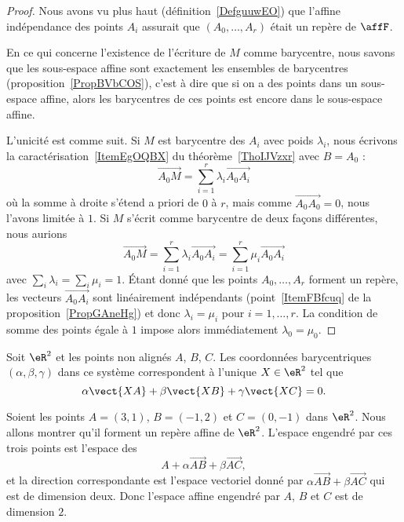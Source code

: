 \begin{proof}
    Nous avons vu plus haut (définition~\ref{DefguuwEO}) que l'affine indépendance des points \( A_i\) assurait que \( (A_0,\ldots, A_r)\) était un repère de \( \affF\).

    En ce qui concerne l'existence de l'écriture de \( M\) comme barycentre, nous savons que les sous-espace affine sont exactement les ensembles de barycentres (proposition~\ref{PropBVbCOS}), c'est à dire que si on a des points dans un sous-espace affine, alors les barycentres de ces points est encore dans le sous-espace affine.

    L'unicité est comme suit. Si \( M\) est barycentre des \( A_i\) avec poids \( \lambda_i\), nous écrivons la caractérisation~\ref{ItemEgOQBX} du théorème~\ref{ThoIJVzxr} avec \( B=A_0\) :
    \begin{equation}
        \overrightarrow{ A_0M }=\sum_{i=1}^r\lambda_i\overrightarrow{ A_0A_i }
    \end{equation}
    où la somme à droite s'étend a priori de \( 0\) à \( r\), mais comme \( \overrightarrow{ A_0A_0 }=0\), nous l'avons limitée à \( 1\). Si \( M\) s'écrit comme barycentre de deux façons différentes, nous aurions
    \begin{equation}
        \overrightarrow{ A_0M }=\sum_{i=1}^r\lambda_i\overrightarrow{ A_0A_i }=\sum_{i=1}^r\mu_i\overrightarrow{ A_0A_i }
    \end{equation}
    avec \( \sum_i\lambda_i=\sum_i\mu_i=1\). Étant donné que les points \( A_0,\ldots, A_r\) forment un repère, les vecteurs \( \overrightarrow{ A_0A_i }\) sont linéairement indépendants (point~\ref{ItemFBfcuq} de la proposition~\ref{PropGAneHg}) et donc \( \lambda_i=\mu_i\) pour \( i=1,\ldots, r\). La condition de somme des points égale à \( 1\) impose alors immédiatement \( \lambda_0=\mu_0\).
\end{proof}

\begin{normaltext}      \label{NORMooOGHBooMjmouu}
    Soit \( \eR^2\) et les points non alignés \( A\), \( B\), \( C\). Les coordonnées barycentriques \( (\alpha,\beta,\gamma)\) dans ce système correspondent à l'unique \( X\in \eR^2\) tel que
    \begin{equation}
        \alpha \vect{ XA }+\beta\vect{ XB }+\gamma\vect{ XC }=0.
    \end{equation}
\end{normaltext}

\begin{example}
    Soient les points \( A=(3,1)\), \( B=(-1,2)\) et \( C=(0,-1)\) dans \( \eR^2\). Nous allons montrer qu'il forment un repère affine de \( \eR^2\). L'espace engendré par ces trois points est l'espace des
    \begin{equation}
        A+\alpha\overrightarrow{ AB }+\beta\overrightarrow{ AC },
    \end{equation}
    et la direction correspondante est l'espace vectoriel donné par \( \alpha\overrightarrow{ AB }+\beta\overrightarrow{ AC }\) qui est de dimension deux. Donc l'espace affine engendré par \( A\), \( B\) et \( C\) est de dimension \( 2\).
\end{example}

